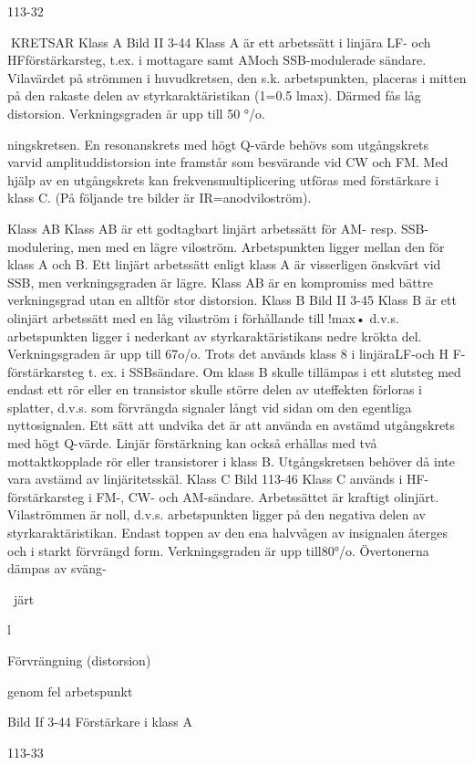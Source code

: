 {{{113-32

KRETSAR
Klass A
Bild II 3-44
Klass A är ett arbetssätt i linjära LF- och HFförstärkarsteg, t.ex. i mottagare samt AMoch SSB-modulerade sändare. Vilavärdet
på strömmen i huvudkretsen, den s.k. arbetspunkten, placeras i mitten på den rakaste delen av styrkaraktäristikan (1=0.5 lmax).
Därmed fås låg distorsion. Verkningsgraden
är upp till 50 °/o.

ningskretsen. En resonanskrets med högt
Q-värde behövs som utgångskrets varvid
amplituddistorsion inte framstår som besvärande vid CW och FM. Med hjälp av en
utgångskrets kan frekvensmultiplicering utföras med förstärkare i klass C.
(På följande tre bilder är IR=anodviloström).

Klass AB
Klass AB är ett godtagbart linjärt arbetssätt
för AM- resp. SSB-modulering, men med en
lägre viloström. Arbetspunkten ligger mellan
den för klass A och B. Ett linjärt arbetssätt
enligt klass A är visserligen önskvärt vid
SSB, men verkningsgraden är lägre. Klass
AB är en kompromiss med bättre verkningsgrad utan en alltför stor distorsion.
Klass B
Bild II 3-45
Klass B är ett olinjärt arbetssätt med en låg
vilaström i förhållande till !max• d.v.s. arbetspunkten ligger i nederkant av styrkaraktäristikans nedre krökta del. Verkningsgraden
är upp till 67o/o. Trots det används klass 8 i
linjäraLF-och H F-förstärkarsteg t. ex. i SSBsändare.
Om klass B skulle tillämpas i ett slutsteg
med endast ett rör eller en transistor skulle
större delen av uteffekten förloras i splatter,
d.v.s. som förvrängda signaler långt vid sidan om den egentliga nyttosignalen. Ett sätt
att undvika det är att använda en avstämd
utgångskrets med högt Q-värde. Linjär förstärkning kan också erhållas med två mottaktkopplade rör eller transistorer i klass B.
Utgångskretsen behöver då inte vara avstämd av linjäritetsskäl.
Klass C
Bild 113-46
Klass C används i HF-förstärkarsteg i FM-,
CW- och AM-sändare. Arbetssättet är kraftigt olinjärt. Vilaströmmen är noll, d.v.s. arbetspunkten ligger på den negativa delen av
styrkaraktäristikan. Endast toppen av den
ena halvvågen av insignalen återges och i
starkt förvrängd form. Verkningsgraden är
upp till80°/o. Övertonerna dämpas av sväng-

~järt

l

Förvrängning
(distorsion)

genom fel arbetspunkt

Bild If 3-44 Förstärkare i klass A

113-33

}}}
